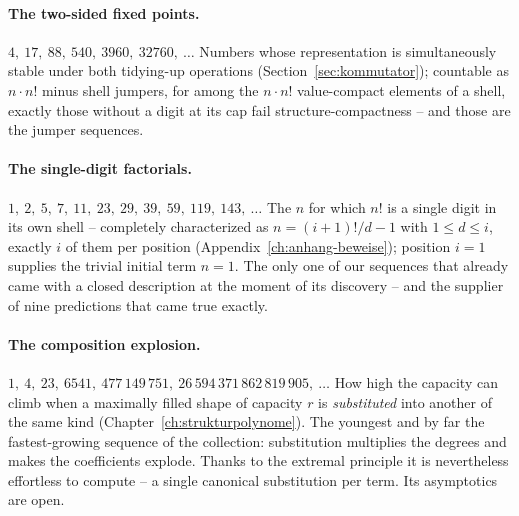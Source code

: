 \paragraph{The two-sided fixed points.}
$4,\ 17,\ 88,\ 540,\ 3960,\ 32760,\ \ldots$
Numbers whose representation is simultaneously stable under both
tidying-up operations (Section~\ref{sec:kommutator}); countable as
$n\cdot n!$ minus shell jumpers, for among the $n\cdot n!$
value-compact elements of a shell, exactly those without a digit
at its cap fail structure-compactness -- and those are the jumper
sequences.

\paragraph{The single-digit factorials.}
$1,\ 2,\ 5,\ 7,\ 11,\ 23,\ 29,\ 39,\ 59,\ 119,\ 143,\ \ldots$
The $n$ for which $n!$ is a single digit in its own shell --
completely characterized as $n=(i+1)!/d-1$ with $1\le d\le i$,
exactly $i$ of them per position
(Appendix~\ref{ch:anhang-beweise}); position $i=1$ supplies the
trivial initial term $n=1$. The only one of our sequences that
already came with a closed description at the moment of its
discovery -- and the supplier of nine predictions that came true
exactly.

\paragraph{The composition explosion.}
$1,\ 4,\ 23,\ 6541,\ 477\,149\,751,\ 26\,594\,371\,862\,819\,905,\ \ldots$
How high the capacity can climb when a maximally filled shape of
capacity $r$ is \emph{substituted} into another of the same kind
(Chapter~\ref{ch:strukturpolynome}). The youngest and by far the
fastest-growing sequence of the collection: substitution
multiplies the degrees and makes the coefficients explode. Thanks
to the extremal principle it is nevertheless effortless to compute
-- a single canonical substitution per term. Its asymptotics are
open.

